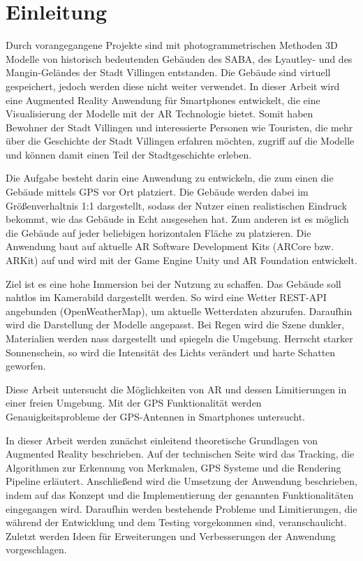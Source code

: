 \section{Einleitung}
Durch vorangegangene Projekte sind mit photogrammetrischen Methoden 3D Modelle von historisch bedeutenden Gebäuden des SABA, des Lyautley- und des Mangin-Geländes der Stadt Villingen entstanden. Die Gebäude sind virtuell gespeichert, jedoch werden diese nicht weiter verwendet. In dieser Arbeit wird eine Augmented Reality Anwendung für Smartphones entwickelt, die eine Visualisierung der Modelle mit der AR Technologie bietet. Somit haben Bewohner der Stadt Villingen und interessierte Personen wie Touristen, die mehr über die Geschichte der Stadt Villingen erfahren möchten, zugriff auf die Modelle und können damit einen Teil der Stadtgeschichte erleben.

Die Aufgabe besteht darin eine Anwendung zu entwickeln, die zum einen die Gebäude mittels GPS vor Ort platziert. Die Gebäude werden dabei im Größenverhaltnis 1:1 dargestellt, sodass der Nutzer einen realistischen Eindruck bekommt, wie das Gebäude in Echt ausgesehen hat. Zum anderen ist es möglich die Gebäude auf jeder beliebigen horizontalen Fläche zu platzieren. Die Anwendung baut auf aktuelle AR Software Development Kits (ARCore bzw. ARKit) auf und wird mit der Game Engine Unity und AR Foundation entwickelt.

Ziel ist es eine hohe Immersion bei der Nutzung zu schaffen. Das Gebäude soll nahtlos im Kamerabild dargestellt werden. So wird eine Wetter REST-API angebunden (OpenWeatherMap), um aktuelle Wetterdaten abzurufen. Daraufhin wird die Darstellung der Modelle angepasst. Bei Regen wird die Szene dunkler, Materialien werden nass dargestellt und spiegeln die Umgebung. Herrscht starker Sonnenschein, so wird die Intensität des Lichts verändert und harte Schatten geworfen.

Diese Arbeit untersucht die Möglichkeiten von AR und dessen Limitierungen in einer freien Umgebung. Mit der GPS Funktionalität werden Genauigkeitsprobleme der GPS-Antennen in Smartphones untersucht.

In dieser Arbeit werden zunächst einleitend theoretische Grundlagen von Augmented Reality beschrieben. Auf der technischen Seite wird das Tracking, die Algorithmen zur Erkennung von Merkmalen, GPS Systeme und die Rendering Pipeline erläutert. Anschließend wird die Umsetzung der Anwendung beschrieben, indem auf das Konzept und die Implementierung der genannten Funktionalitäten eingegangen wird. Daraufhin werden bestehende Probleme und Limitierungen, die während der Entwicklung und dem Testing vorgekommen sind, veranschaulicht. Zuletzt werden Ideen für Erweiterungen und Verbesserungen der Anwendung vorgeschlagen.